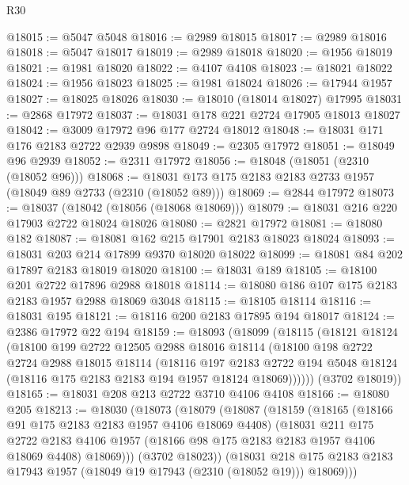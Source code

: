 \begin{lexlean}{R30}
\begin{coremodule}
@18015 := @5047 @5048
@18016 := @2989 @18015
@18017 := @2989 @18016
@18018 := @5047 @18017
@18019 := @2989 @18018
@18020 := @1956 @18019
@18021 := @1981 @18020
@18022 := @4107 @4108
@18023 := @18021 @18022
@18024 := @1956 @18023
@18025 := @1981 @18024
@18026 := @17944 @1957
@18027 := @18025 @18026
@18030 := @18010 (@18014 @18027) @17995
@18031 := @2868 @17972
@18037 := @18031 @178 @221 @2724 @17905 @18013 @18027
@18042 := @3009 @17972 @96 @177 @2724 @18012
@18048 := @18031 @171 @176 @2183 @2722 @2939 @9898
@18049 := @2305 @17972
@18051 := @18049 @96 @2939
@18052 := @2311 @17972
@18056 := @18048 (@18051 (@2310 (@18052 @96)))
@18068 := @18031 @173 @175 @2183 @2183 @2733 @1957 (@18049 @89 @2733 (@2310 (@18052 @89)))
@18069 := @2844 @17972
@18073 := @18037 (@18042 (@18056 (@18068 @18069)))
@18079 := @18031 @216 @220 @17903 @2722 @18024 @18026
@18080 := @2821 @17972
@18081 := @18080 @182
@18087 := @18081 @162 @215 @17901 @2183 @18023 @18024
@18093 := @18031 @203 @214 @17899 @9370 @18020 @18022
@18099 := @18081 @84 @202 @17897 @2183 @18019 @18020
@18100 := @18031 @189
@18105 := @18100 @201 @2722 @17896 @2988 @18018
@18114 := @18080 @186 @107 @175 @2183 @2183 @1957 @2988 @18069 @3048
@18115 := @18105 @18114
@18116 := @18031 @195
@18121 := @18116 @200 @2183 @17895 @194 @18017
@18124 := @2386 @17972 @22 @194
@18159 := @18093
    (@18099
      (@18115
        (@18121
          @18124
          (@18100
            @199
            @2722
            @12505
            @2988
            @18016
            @18114
            (@18100
              @198
              @2722
              @2724
              @2988
              @18015
              @18114
              (@18116
                @197
                @2183
                @2722
                @194
                @5048
                @18124
                (@18116 @175 @2183 @2183 @194 @1957 @18124 @18069))))))
      (@3702 @18019))
@18165 := @18031 @208 @213 @2722 @3710 @4106 @4108
@18166 := @18080 @205
@18213 := @18030
    (@18073
      (@18079
        (@18087
          (@18159
            (@18165
              (@18166 @91 @175 @2183 @2183 @1957 @4106 @18069 @4408)
              (@18031
                @211
                @175
                @2722
                @2183
                @4106
                @1957
                (@18166 @98 @175 @2183 @2183 @1957 @4106 @18069 @4408)
                @18069)))
          (@3702 @18023))
        (@18031
          @218
          @175
          @2183
          @2183
          @17943
          @1957
          (@18049 @19 @17943 (@2310 (@18052 @19)))
          @18069)))

\end{coremodule}
\end{lexlean}
